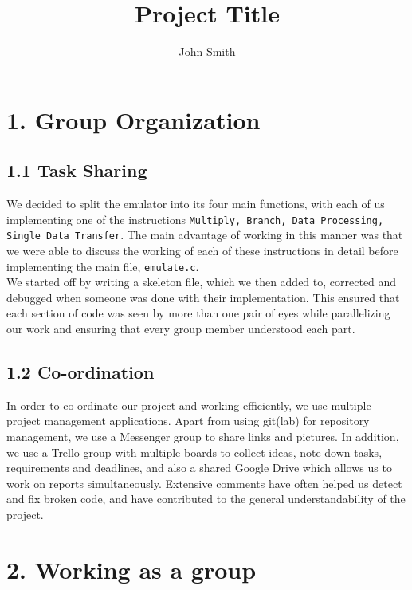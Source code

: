 \documentclass[a4paper, twoside]{report}
\title{Project Title}
\author{John Smith}
\begin{document}



\section*{1. Group Organization}

\subsection*{1.1 Task Sharing}
We decided to split the emulator into its four main functions, with each of us implementing one of the instructions \verb|Multiply, Branch, Data Processing, Single Data Transfer|. The main advantage of working in this manner was that we were able to discuss the working of each of these instructions in detail before implementing the main file, \verb|emulate.c|. \\
We started off by writing a skeleton file, which we then added to, corrected and debugged when someone was done with their implementation. This ensured that each section of code was seen by more than one pair of eyes while parallelizing our work and ensuring that every group member understood each part.


\subsection*{1.2 Co-ordination}
In order to co-ordinate our project and working efficiently, we use multiple project management applications. Apart from using git(lab) for repository management, we use a Messenger group to share links and pictures. In addition, we use a Trello group with multiple boards to collect ideas, note down tasks, requirements and deadlines, and also a shared Google Drive which allows us to work on reports simultaneously.  Extensive comments have often helped us detect and fix broken code, and have contributed to the general understandability of the project. 

\section*{}


\section*{2. Working as a group}
\end{document}
